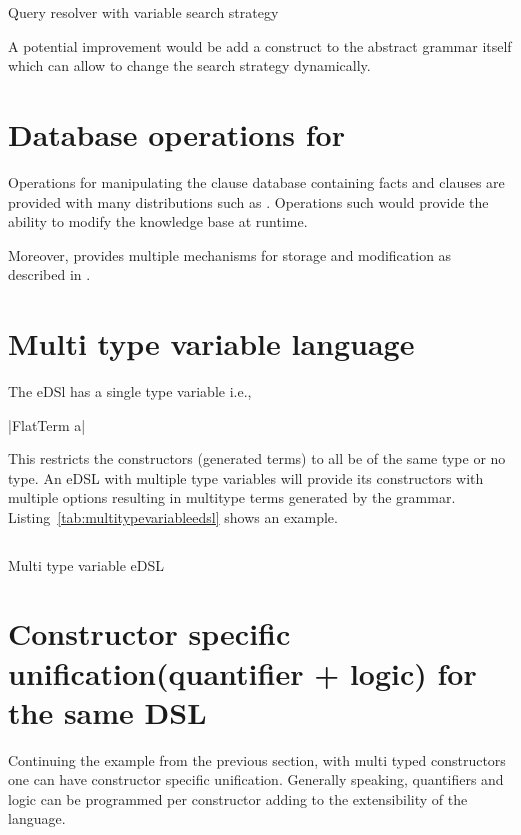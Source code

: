 \documentclass[thesis-solanki.tex]{subfiles}
\begin{document}
\begin{code-list}[H]
\begin{singlespace}
\inputminted{haskell}{haskell-proto4-query-resolver-variable-search-strat.hs}
\end{singlespace}
\caption{Query resolver with variable search strategy}
\label{tab:queryresolvervariablesearchstrat}
\end{code-list}  

A potential improvement would be add a construct to the abstract grammar itself which can allow to change the search strategy dynamically.

\section{Database operations for }
Operations for manipulating the clause database containing facts and clauses are provided with many  distributions such as
 \cite{website:swiprologdbops}. Operations such  \cite{website:assertzswiprolog} would provide
the ability to modify the knowledge base at runtime. 

Moreover,  provides multiple mechanisms for storage and modification as described in \cite{website:swiprologdbops}.

\section{Multi type variable language}
The eDSl  has a single type variable i.e.,

|FlatTerm a|

This restricts the constructors (generated terms) to all be of the same type or no type. An eDSL with multiple type variables will provide
its constructors with multiple options resulting in multitype terms generated by the grammar. Listing~\ref{tab:multitypevariableedsl} shows 
an example.

\begin{code-list}[H]
\begin{singlespace}
\inputminted{haskell}{haskell-proto4-multi-type-variable-edsl.hs}
\end{singlespace}
\caption{Multi type variable eDSL}
\label{tab:multitypevariableedsl}
\end{code-list}

\section{Constructor specific unification(quantifier + logic) for the same DSL}
Continuing the example from the previous section, with multi typed constructors one can have constructor specific unification. Generally 
speaking, quantifiers and logic can be programmed per constructor adding to the extensibility of the language.   
\end{document}
